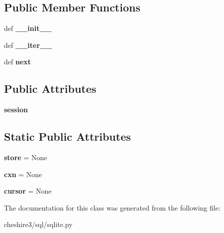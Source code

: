 \subsection*{Public Member Functions}
\begin{DoxyCompactItemize}
\item 
\hypertarget{classcheshire3_1_1sql_1_1sqlite_1_1_s_q_lite_iter_ad8c77dab760c4cdc1c4b0efb47abf9df}{def {\bfseries \-\_\-\-\_\-init\-\_\-\-\_\-}}\label{classcheshire3_1_1sql_1_1sqlite_1_1_s_q_lite_iter_ad8c77dab760c4cdc1c4b0efb47abf9df}

\item 
\hypertarget{classcheshire3_1_1sql_1_1sqlite_1_1_s_q_lite_iter_a3085a3a86cac497c2b6fb79bb6a30490}{def {\bfseries \-\_\-\-\_\-iter\-\_\-\-\_\-}}\label{classcheshire3_1_1sql_1_1sqlite_1_1_s_q_lite_iter_a3085a3a86cac497c2b6fb79bb6a30490}

\item 
\hypertarget{classcheshire3_1_1sql_1_1sqlite_1_1_s_q_lite_iter_aa4e92ee9b7f28a56b1791880129573da}{def {\bfseries next}}\label{classcheshire3_1_1sql_1_1sqlite_1_1_s_q_lite_iter_aa4e92ee9b7f28a56b1791880129573da}

\end{DoxyCompactItemize}
\subsection*{Public Attributes}
\begin{DoxyCompactItemize}
\item 
\hypertarget{classcheshire3_1_1sql_1_1sqlite_1_1_s_q_lite_iter_a417c61e1d2ce20326d4da7bd52f59def}{{\bfseries session}}\label{classcheshire3_1_1sql_1_1sqlite_1_1_s_q_lite_iter_a417c61e1d2ce20326d4da7bd52f59def}

\end{DoxyCompactItemize}
\subsection*{Static Public Attributes}
\begin{DoxyCompactItemize}
\item 
\hypertarget{classcheshire3_1_1sql_1_1sqlite_1_1_s_q_lite_iter_a2ecff41721a70be480e824bbaaf06d24}{{\bfseries store} = None}\label{classcheshire3_1_1sql_1_1sqlite_1_1_s_q_lite_iter_a2ecff41721a70be480e824bbaaf06d24}

\item 
\hypertarget{classcheshire3_1_1sql_1_1sqlite_1_1_s_q_lite_iter_a2749456a0eb1f03a36330986dca6e78f}{{\bfseries cxn} = None}\label{classcheshire3_1_1sql_1_1sqlite_1_1_s_q_lite_iter_a2749456a0eb1f03a36330986dca6e78f}

\item 
\hypertarget{classcheshire3_1_1sql_1_1sqlite_1_1_s_q_lite_iter_a15d657c610c64a4f164510ba34657d27}{{\bfseries cursor} = None}\label{classcheshire3_1_1sql_1_1sqlite_1_1_s_q_lite_iter_a15d657c610c64a4f164510ba34657d27}

\end{DoxyCompactItemize}


The documentation for this class was generated from the following file\-:\begin{DoxyCompactItemize}
\item 
cheshire3/sql/sqlite.\-py\end{DoxyCompactItemize}
